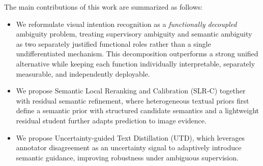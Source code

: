 The main contributions of this work are summarized as follows:
\begin{itemize}
    \item We reformulate visual intention recognition as a \emph{functionally decoupled} ambiguity problem, treating supervisory ambiguity and semantic ambiguity as two separately justified functional roles rather than a single undifferentiated mechanism. This decomposition outperforms a strong unified alternative while keeping each function individually interpretable, separately measurable, and independently deployable.
    \item We propose Semantic Local Reranking and Calibration (SLR-C) together with residual semantic refinement, where heterogeneous textual priors first define a semantic prior with structured candidate semantics and a lightweight residual student further adapts prediction to image evidence.
    \item We propose Uncertainty-guided Text Distillation (UTD), which leverages annotator disagreement as an uncertainty signal to adaptively introduce semantic guidance, improving robustness under ambiguous supervision.
\end{itemize}
